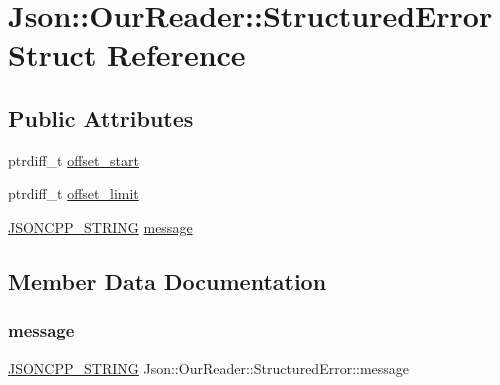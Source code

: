\hypertarget{structJson_1_1OurReader_1_1StructuredError}{}\section{Json\+:\+:Our\+Reader\+:\+:Structured\+Error Struct Reference}
\label{structJson_1_1OurReader_1_1StructuredError}
\subsection*{Public Attributes}
\begin{DoxyCompactItemize}
\item 
ptrdiff\+\_\+t \hyperlink{structJson_1_1OurReader_1_1StructuredError_a102677698afb8177c985e72dafe72b15_a102677698afb8177c985e72dafe72b15}{offset\+\_\+start}
\item 
ptrdiff\+\_\+t \hyperlink{structJson_1_1OurReader_1_1StructuredError_a15491a751a39c5153af04e68b1d0abb9_a15491a751a39c5153af04e68b1d0abb9}{offset\+\_\+limit}
\item 
\hyperlink{json_8h_a1e723f95759de062585bc4a8fd3fa4be_a1e723f95759de062585bc4a8fd3fa4be}{J\+S\+O\+N\+C\+P\+P\+\_\+\+S\+T\+R\+I\+NG} \hyperlink{structJson_1_1OurReader_1_1StructuredError_a9d0b9986bf765d067dfcf2f971a450d1_a9d0b9986bf765d067dfcf2f971a450d1}{message}
\end{DoxyCompactItemize}


\subsection{Member Data Documentation}
\mbox{\label{structJson_1_1OurReader_1_1StructuredError_a9d0b9986bf765d067dfcf2f971a450d1_a9d0b9986bf765d067dfcf2f971a450d1}} 
\subsubsection{\texorpdfstring{message}{message}}
{\footnotesize\ttfamily \hyperlink{json_8h_a1e723f95759de062585bc4a8fd3fa4be_a1e723f95759de062585bc4a8fd3fa4be}{J\+S\+O\+N\+C\+P\+P\+\_\+\+S\+T\+R\+I\+NG} Json\+::\+Our\+Reader\+::\+Structured\+Error\+::message}



